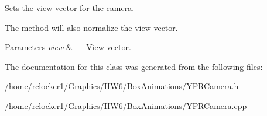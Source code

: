 Sets the view vector for the camera. 

The method will also normalize the view vector.


\begin{DoxyParams}{Parameters}
{\em view} & --- View vector. \\
\hline
\end{DoxyParams}


The documentation for this class was generated from the following files\+:\begin{DoxyCompactItemize}
\item 
/home/rclocker1/\+Graphics/\+H\+W6/\+Box\+Animations/\hyperlink{_y_p_r_camera_8h}{Y\+P\+R\+Camera.\+h}\item 
/home/rclocker1/\+Graphics/\+H\+W6/\+Box\+Animations/\hyperlink{_y_p_r_camera_8cpp}{Y\+P\+R\+Camera.\+cpp}\end{DoxyCompactItemize}
